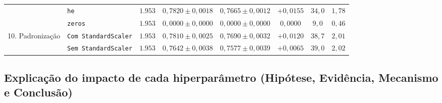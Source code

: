 \documentclass[12pt,a4paper]{article}
\begin{document}
\begin{table}[H]
{\begin{tabular}{llcccccc}
 & \texttt{he} & $1.953$ & $0{,}7820 \pm 0{,}0018$ & $0{,}7665 \pm 0{,}0012$ & $+0{,}0155$ & $34{,}0$ & $1{,}78$ \\
 & \texttt{zeros} & $1.953$ & $0{,}0000 \pm 0{,}0000$ & $0{,}0000 \pm 0{,}0000$ & $0{,}0000$ & $9{,}0$ & $0{,}46$ \\
\midrule
\multirow{2}{*}{10. Padronização} 
 & \texttt{Com StandardScaler} & $1.953$ & $0{,}7810 \pm 0{,}0025$ & $0{,}7690 \pm 0{,}0032$ & $+0{,}0120$ & $38{,}7$ & $2{,}01$ \\
 & \texttt{Sem StandardScaler} & $1.953$ & $0{,}7642 \pm 0{,}0038$ & $0{,}7577 \pm 0{,}0039$ & $+0{,}0065$ & $39{,}0$ & $2{,}02$ \\
\bottomrule
\end{tabular}%
}
\end{table}

\subsection{Explicação do impacto de cada hiperparâmetro (Hipótese, Evidência, Mecanismo e Conclusão)}
\end{document}
